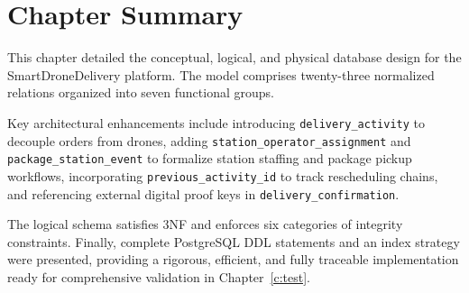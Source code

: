 \section{Chapter Summary}\label{s:ch3summary}

\qquad This chapter detailed the conceptual, logical, and physical database design for the SmartDroneDelivery platform. The model comprises twenty-three normalized relations organized into seven functional groups.

Key architectural enhancements include introducing \texttt{delivery\_activity} to decouple orders from drones, adding \texttt{station\_operator\_assignment} and \texttt{package\_station\_event} to formalize station staffing and package pickup workflows, incorporating \texttt{previous\_activity\_id} to track rescheduling chains, and referencing external digital proof keys in \texttt{delivery\_confirmation}.

The logical schema satisfies 3NF and enforces six categories of integrity constraints. Finally, complete PostgreSQL DDL statements and an index strategy were presented, providing a rigorous, efficient, and fully traceable implementation ready for comprehensive validation in Chapter~\ref{c:test}.